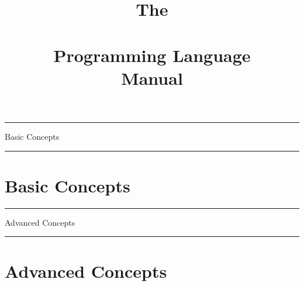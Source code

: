 \documentclass[10pt]{article}
\begin{document}
\title{The\\ \charmpp\\ Programming Language\\ Manual}  \credits {  \hspace{0 in} }
\maketitle



\begin{titlepage}%
 \rule{\textwidth}{3pt}
 \vspace{\fill}
 \begin{flushright}
   \textsf{\Huge Basic Concepts \\}
 \end{flushright}
 \vspace{\fill}
 \rule{\textwidth}{3pt}
\end{titlepage}



\section{Basic Concepts}

  	
  	
  
  
  
  
  
  
  
  
\begin{titlepage}%
 \rule{\textwidth}{3pt}
 \vspace{\fill}
 \begin{flushright}
   \textsf{\Huge Advanced Concepts \\}
 \end{flushright}
 \vspace{\fill}
 \rule{\textwidth}{3pt}
\end{titlepage}

\section{Advanced Concepts}

  
  
  
  
  
  
  
  
  
  
  
      
      
  
  
  



%






\appendix


%






\end{document}
